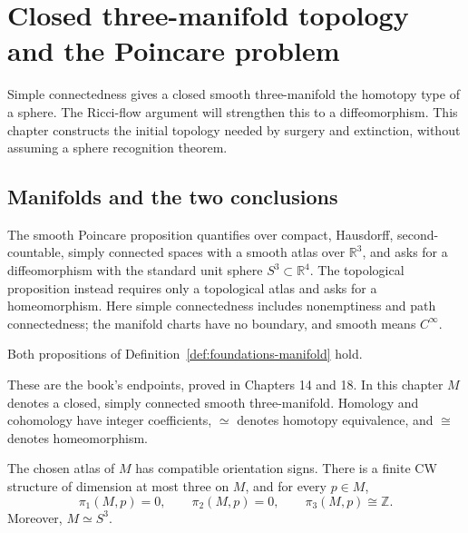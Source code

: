 \chapter{Closed three-manifold topology and the Poincare problem}
\label{ch:foundations-v4}

Simple connectedness gives a closed smooth three-manifold the homotopy
type of a sphere. The Ricci-flow argument will strengthen this to a
diffeomorphism. This chapter constructs the initial topology needed by
surgery and extinction, without assuming a sphere recognition theorem.

\section{Manifolds and the two conclusions}
\label{sec:foundations-endpoints}

\begin{definition}
\label{def:foundations-manifold}
The smooth Poincare proposition quantifies over compact, Hausdorff,
second-countable, simply connected spaces with a smooth atlas over
$\mathbb R^3$, and asks for a diffeomorphism with the standard unit
sphere $S^3\subset\mathbb R^4$. The topological proposition instead
requires only a topological atlas and asks for a homeomorphism.
Here simple connectedness includes nonemptiness and path connectedness;
the manifold charts have no boundary, and smooth means $C^\infty$.
\end{definition}

\begin{theorem}
\label{thm:foundations-targets}
Both propositions of Definition~\ref{def:foundations-manifold} hold.
\end{theorem}

These are the book's endpoints, proved in Chapters 14 and 18. In this
chapter $M$ denotes a closed, simply connected smooth three-manifold.
Homology and cohomology have integer coefficients, $\simeq$ denotes
homotopy equivalence, and $\cong$ denotes homeomorphism.

\begin{proposition}
\label{prop:foundations-initial}
The chosen atlas of $M$ has compatible orientation signs. There is a
finite CW structure of dimension at most three on $M$, and for every
$p\in M$,
\[
 \pi_1(M,p)=0,\qquad \pi_2(M,p)=0,\qquad
 \pi_3(M,p)\cong\mathbb Z.
\]
Moreover, $M\simeq S^3$.
\end{proposition}

